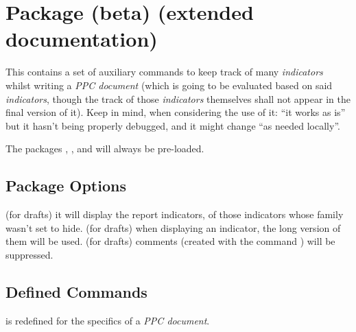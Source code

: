 \documentclass[dctools,english]{ufrgscca} %
\begin{document}
\section{ Package (beta) (extended documentation)}
This contains a set of auxiliary commands to keep track of many \emph{indicators} whilst writing  a \emph{PPC document} (which is going to be evaluated based on said \emph{indicators}, though the track of those \emph{indicators} themselves shall not appear in the final version of it). Keep in mind, when considering the use of it: “it works as is” but it hasn't being properly debugged, and it might change “as needed locally”.

The packages , ,  and  will always be pre-loaded.

\subsection{Package Options}
\begin{Options}
 (for drafts) it will display the report indicators, of those indicators whose family wasn't set to hide.
 (for drafts) when displaying an indicator, the long version of them will be used.
 (for drafts) comments (created with the command \Macro{\comment}) will be suppressed.
\end{Options}

\subsection{Defined Commands}
\begin{Macros}{\maketitle}
    \begin{Syntax}%
        \Macro{\maketitle}{}
    \end{Syntax}
\Macro{\maketitle}{} is redefined for the specifics of a \emph{PPC document}.
\end{Macros}
\end{document}
